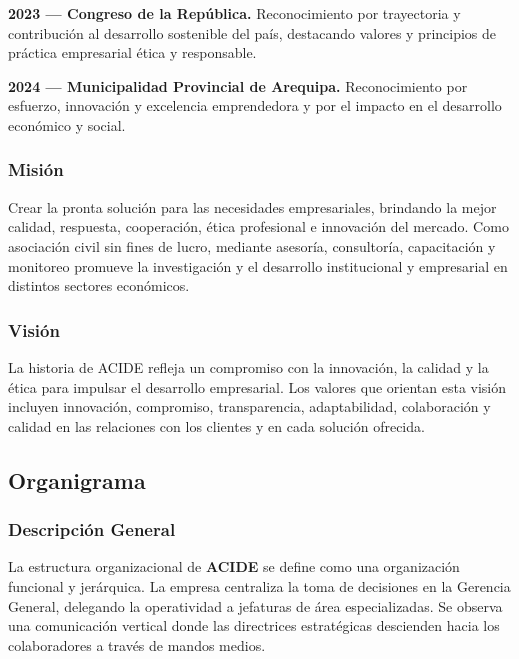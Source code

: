 \documentclass[12pt]{article}
\begin{document}
\textbf{2023 — Congreso de la República.} Reconocimiento por trayectoria y contribución al desarrollo sostenible del país, destacando valores y principios de práctica empresarial ética y responsable.

\textbf{2024 — Municipalidad Provincial de Arequipa.} Reconocimiento por esfuerzo, innovación y excelencia emprendedora y por el impacto en el desarrollo económico y social.

\subsubsection{Misión}
Crear la pronta solución para las necesidades empresariales, brindando la mejor calidad, respuesta, cooperación, ética profesional e innovación del mercado. Como asociación civil sin fines de lucro, mediante asesoría, consultoría, capacitación y monitoreo promueve la investigación y el desarrollo institucional y empresarial en distintos sectores económicos.

\subsubsection{Visión}
La historia de ACIDE refleja un compromiso con la innovación, la calidad y la ética para impulsar el desarrollo empresarial. Los valores que orientan esta visión incluyen innovación, compromiso, transparencia, adaptabilidad, colaboración y calidad en las relaciones con los clientes y en cada solución ofrecida.

\subsection{Organigrama}
\subsubsection{Descripción General}
La estructura organizacional de \textbf{ACIDE} se define como una organización funcional y jerárquica. La empresa centraliza la toma de decisiones en la Gerencia General, delegando la operatividad a jefaturas de área especializadas. Se observa una comunicación vertical donde las directrices estratégicas descienden hacia los colaboradores a través de mandos medios.
\end{document}
